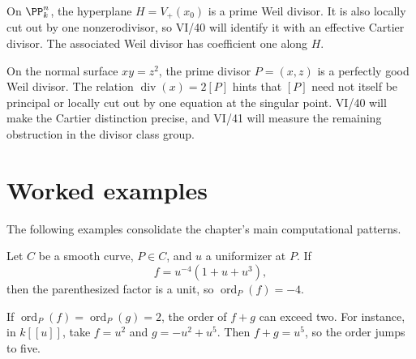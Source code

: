 \begin{example}\label{ex:vi39-hyperplane-preview}
On \(\PP^n_k\), the hyperplane \(H=V_+(x_0)\) is a prime Weil divisor.  It is also locally cut out by one nonzerodivisor, so VI/40 will identify it with an effective Cartier divisor.  The associated Weil divisor has coefficient one along \(H\).
\end{example}



\begin{example}\label{ex:vi39-noncartier-preview}
On the normal surface \(xy=z^2\), the prime divisor \(P=(x,z)\) is a perfectly good Weil divisor.  The relation \(\operatorname{div}(x)=2[P]\) hints that \([P]\) need not itself be principal or locally cut out by one equation at the singular point.  VI/40 will make the Cartier distinction precise, and VI/41 will measure the remaining obstruction in the divisor class group.
\end{example}

\section{Worked examples}
The following examples consolidate the chapter's main computational patterns.

\begin{example}\label{ex:vi39-worked-local}
Let \(C\) be a smooth curve, \(P\in C\), and \(u\) a uniformizer at \(P\).  If
\[
 f=u^{-4}(1+u+u^3),
\]
then the parenthesized factor is a unit, so \(\operatorname{ord}_P(f)=-4\).
\end{example}

\begin{example}\label{ex:vi39-worked-cancel}
If \(\operatorname{ord}_P(f)=\operatorname{ord}_P(g)=2\), the order of \(f+g\) can exceed two.  For instance, in \(k[[u]]\), take \(f=u^2\) and \(g=-u^2+u^5\).  Then \(f+g=u^5\), so the order jumps to five.
\end{example}

